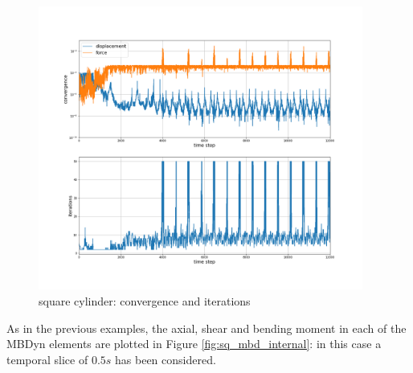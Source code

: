 \begin{figure}[htbp!]
	\centering
	\includegraphics[width=0.95\textwidth, trim=0 80 0 100, clip]{images/sq-cyl/MBD_iterations_sq.png}
	\caption{square cylinder: convergence and iterations}
	\label{fig:sq_mbd_iter}
\end{figure}

As in the previous examples, the axial, shear and bending moment in each of the MBDyn elements are plotted in Figure \ref{fig:sq_mbd_internal}: in this case a temporal slice of $0.5s$ has been considered.


